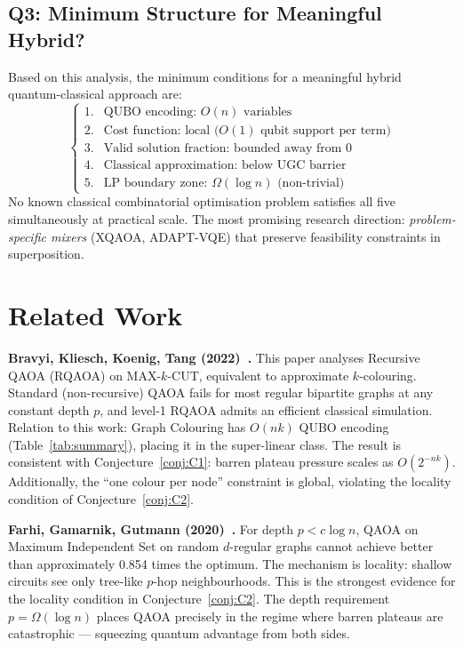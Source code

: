 \documentclass[11pt]{article}
\theoremstyle{remark}
\begin{document}
\subsection*{Q3: Minimum Structure for Meaningful Hybrid?}

Based on this analysis, the minimum conditions for a meaningful hybrid
quantum-classical approach are:
\begin{equation}
  \begin{cases}
    1. & \text{QUBO encoding: } O(n) \text{ variables} \\
    2. & \text{Cost function: local ($O(1)$ qubit support per term)} \\
    3. & \text{Valid solution fraction: bounded away from 0} \\
    4. & \text{Classical approximation: below UGC barrier} \\
    5. & \text{LP boundary zone: } \Omega(\log n) \text{ (non-trivial)}
  \end{cases}
\end{equation}
No known classical combinatorial optimisation problem satisfies all five
simultaneously at practical scale. The most promising research direction:
\emph{problem-specific mixers} (XQAOA, ADAPT-VQE) that preserve feasibility
constraints in superposition.

\section{Related Work}
\label{sec:related}

\textbf{Bravyi, Kliesch, Koenig, Tang (2022)~\cite{bravyi2022hybrid}.}
This paper analyses Recursive QAOA (RQAOA) on MAX-$k$-CUT, equivalent to
approximate $k$-colouring. Standard (non-recursive) QAOA fails for most
regular bipartite graphs at any constant depth $p$, and level-1 RQAOA
admits an efficient classical simulation. Relation to this work: Graph
Colouring has $O(nk)$ QUBO encoding (Table~\ref{tab:summary}), placing it
in the super-linear class. The result is consistent with
Conjecture~\ref{conj:C1}: barren plateau pressure scales as $O(2^{-nk})$.
Additionally, the ``one colour per node'' constraint is global, violating
the locality condition of Conjecture~\ref{conj:C2}.

\textbf{Farhi, Gamarnik, Gutmann (2020)~\cite{farhi2020typical,farhi2020worst}.}
For depth $p < c\log n$, QAOA on Maximum Independent Set on random
$d$-regular graphs cannot achieve better than approximately 0.854 times
the optimum. The mechanism is locality: shallow circuits see only tree-like
$p$-hop neighbourhoods. This is the strongest evidence for the locality
condition in Conjecture~\ref{conj:C2}. The depth requirement $p = \Omega(\log n)$
places QAOA precisely in the regime where barren plateaus are catastrophic
--- squeezing quantum advantage from both sides.
\end{document}
